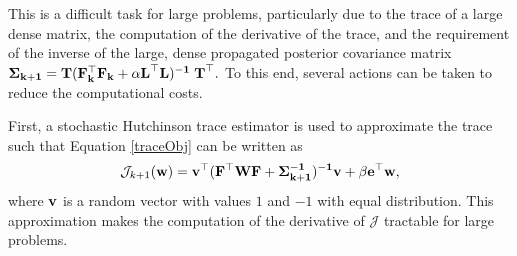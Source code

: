 \documentclass[12pt]{article}
\newcommand {\bfv}   { {\bf v} }
\newcommand {\bfe}   { {\bf e} }
\newcommand {\bfw}   { {\bf w} }
\newcommand {\bfF}  { {\bf F} }
\newcommand{\bT}  {\text{\bf T}} %
\newcommand{\bfL}  {\text{{\bf L}}} %
\newcommand{\JJ}  {\mathcal{J}}    %
\newcommand{\W}{\text{\bf W}}
\newcommand{\Sigh}{\bf \Sigma}
\begin{document}
This is a difficult task for large problems, particularly due to the trace of a large dense matrix, the computation of the derivative of the trace, and the requirement of the inverse of the large, dense propagated posterior covariance matrix $\Sigh_{k+1} = {\bT}(\bfF_k^{\top} \bfF_k +\alpha \bfL^{\top} \bfL)^{-1}\;{\bT}^{\top}.$ To this end, several actions can be taken to reduce the computational costs.

First, a stochastic Hutchinson trace estimator is used to approximate the trace  \cite{Hutchinson1989,habera} such that Equation \eqref{traceObj} can be written as
\begin{equation}
\label{Obj}
\JJ_{k+1}(\bfw) = \bfv^{\top}(\bfF^{\top} \W \bfF + \Sigh_{k+1}^{-1})^{-1}\bfv + \beta \bfe^{\top}\bfw,
\end{equation}
where $\bfv$ is a random vector with values $1$ and $-1$ with equal distribution. This approximation makes the computation of the derivative of $\JJ$ tractable for large problems. \\
\end{document}
